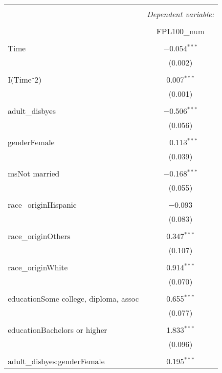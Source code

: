 \begin{table}[!htbp] \centering 
\footnotesize
  \caption{} 
  \label{} 
\begin{tabular}{@{\extracolsep{5pt}}lc} 
\\[-1.8ex]\hline 
\hline \\[-1.8ex] 
 & \multicolumn{1}{c}{\textit{Dependent variable:}} \\ 
\cline{2-2} 
\\[-1.8ex] & FPL100\_num \\ 
\hline \\[-1.8ex] 
 Time & $-$0.054$^{***}$ \\ 
  & (0.002) \\ 
  & \\ 
 I(Time$\hat{\mkern6mu}$2) & 0.007$^{***}$ \\ 
  & (0.001) \\ 
  & \\ 
 adult\_disbyes & $-$0.506$^{***}$ \\ 
  & (0.056) \\ 
  & \\ 
 genderFemale & $-$0.113$^{***}$ \\ 
  & (0.039) \\ 
  & \\ 
 msNot married & $-$0.168$^{***}$ \\ 
  & (0.055) \\ 
  & \\ 
 race\_originHispanic & $-$0.093 \\ 
  & (0.083) \\ 
  & \\ 
 race\_originOthers & 0.347$^{***}$ \\ 
  & (0.107) \\ 
  & \\ 
 race\_originWhite & 0.914$^{***}$ \\ 
  & (0.070) \\ 
  & \\ 
 educationSome college, diploma, assoc & 0.655$^{***}$ \\ 
  & (0.077) \\ 
  & \\ 
 educationBachelors or higher & 1.833$^{***}$ \\ 
  & (0.096) \\ 
  & \\ 
 adult\_disbyes:genderFemale & 0.195$^{***}$ \\ 

\end{tabular}
\end{table}
